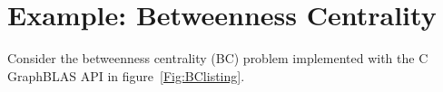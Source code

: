 \section{Example: Betweenness Centrality}

\label{sec:example}
Consider the betweenness centrality (BC) problem implemented with the 
C GraphBLAS API in figure~\ref{Fig:BClisting}.
\begin{figure*}[h]
\caption{C function to compute the BC-metric vector, delta, given a boolean n x n adjacency matrix A and a source vertex s (which should be empty on input).}
\label{Fig:BClisting}
{\scriptsize

}
\end{figure*}